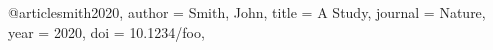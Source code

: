 @article{smith2020,
  author = {Smith, John},
  title = {A Study},
  journal = {Nature},
  year = {2020},
  doi = {10.1234/foo},
}
